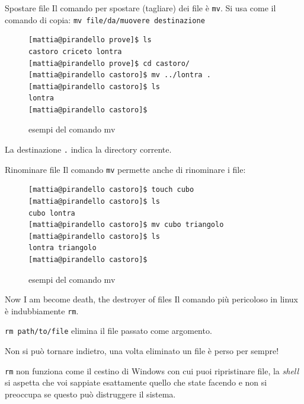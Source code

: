 \begin{frame}[fragile]{Spostare file}
  Il comando per spostare (tagliare) dei file è \texttt{mv}. Si usa come il 
  comando di copia: \texttt{mv file/da/muovere 
  destinazione}
  \begin{figure}
    \begin{lstlisting}[basicstyle=\small]
[mattia@pirandello prove]$ ls 
castoro criceto lontra
[mattia@pirandello prove]$ cd castoro/ 
[mattia@pirandello castoro]$ mv ../lontra .
[mattia@pirandello castoro]$ ls
lontra
[mattia@pirandello castoro]$
    \end{lstlisting}
    \caption{esempi del comando mv}
  \end{figure}
  La destinazione \texttt{.} indica la directory corrente.
\end{frame}

\begin{frame}[fragile]{Rinominare file}
  Il comando \texttt{mv} permette anche di rinominare i file:
  \begin{figure}
    \begin{lstlisting}[basicstyle=\normalsize]
[mattia@pirandello castoro]$ touch cubo
[mattia@pirandello castoro]$ ls
cubo lontra
[mattia@pirandello castoro]$ mv cubo triangolo
[mattia@pirandello castoro]$ ls
lontra triangolo
[mattia@pirandello castoro]$
    \end{lstlisting}
    \caption{esempi del comando mv}
  \end{figure}
\end{frame}

\begin{frame}{Now I am become death, the destroyer of files}
  Il comando più pericoloso in linux è indubbiamente \texttt{rm}.\bigskip

  \texttt{rm path/to/file} elimina il file passato come argomento.\bigskip

  Non si può tornare indietro, una volta eliminato un file è perso per 
  sempre!\bigskip

  \texttt{rm} non funziona come il cestino di Windows con cui puoi ripristinare file,
  la \textit{shell} si aspetta che voi sappiate esattamente quello che state 
  facendo e non si preoccupa se questo può distruggere il sistema.
\end{frame}

